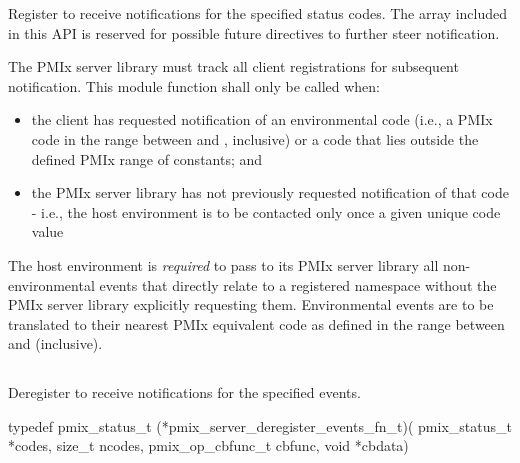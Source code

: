 \reqattrend

\descr

Register to receive notifications for the specified status codes. The  array included in this API is reserved for possible future directives to further steer notification.


\adviceimplstart
The \ac{PMIx} server library must track all client registrations for subsequent notification. This module function shall only be called when:

\begin{itemize}
    \item the client has requested notification of an environmental code (i.e., a \ac{PMIx} code in the range between  and , inclusive) or a code that lies outside the defined \ac{PMIx} range of constants; and
    \item the \ac{PMIx} server library has not previously requested notification of that code - i.e., the host environment is to be contacted only once a given unique code value
\end{itemize}

\adviceimplend

\advicermstart
The host environment is \emph{required} to pass to its \ac{PMIx} server library all non-environmental events that directly relate to a registered namespace without the \ac{PMIx} server library explicitly requesting them. Environmental events are to be translated to their nearest \ac{PMIx} equivalent code as defined in the range between  and  (inclusive).
\advicermend


\subsection{}

\summary

Deregister to receive notifications for the specified events.

\format

\cspecificstart
\begin{codepar}
 typedef pmix_status_t (*pmix_server_deregister_events_fn_t)(
                              pmix_status_t *codes,
                              size_t ncodes,
                              pmix_op_cbfunc_t cbfunc,
                              void *cbdata)
\end{codepar}
\cspecificend

